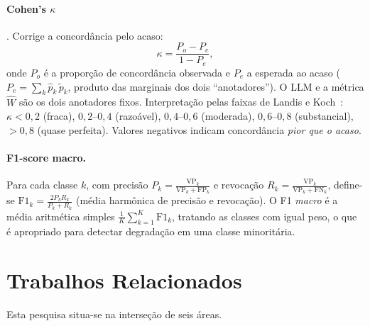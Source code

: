 \documentclass[12pt,a4paper]{article}
\newcommand{\West}{\ensuremath{\hat{W}}}   %
\begin{document}
\paragraph{Cohen's $\kappa$} \cite{artsteinInterCoder2008}. Corrige a concordância pelo
acaso:
\begin{equation}
  \kappa = \frac{P_o - P_e}{1 - P_e},
\end{equation}
onde $P_o$ é a proporção de concordância observada e $P_e$ a esperada ao acaso
($P_e = \sum_k \hat{p}_k\,\tilde{p}_k$, produto das marginais dos dois ``anotadores''). O
LLM e a métrica \West{} são os dois anotadores fixos. Interpretação pelas faixas de Landis e
Koch~\cite{landisKoch1977}: $\kappa<0{,}2$ (fraca),
$0{,}2$–$0{,}4$ (razoável), $0{,}4$–$0{,}6$ (moderada), $0{,}6$–$0{,}8$ (substancial),
$>0{,}8$ (quase perfeita). Valores negativos indicam concordância \emph{pior que o acaso}.

\paragraph{F1-score macro.} Para cada classe $k$, com precisão
$P_k = \frac{\text{VP}_k}{\text{VP}_k + \text{FP}_k}$ e revocação
$R_k = \frac{\text{VP}_k}{\text{VP}_k + \text{FN}_k}$, define-se
$\text{F1}_k = \frac{2 P_k R_k}{P_k + R_k}$ (média harmônica de precisão e revocação). O
F1 \emph{macro} é a média aritmética simples $\frac{1}{K}\sum_{k=1}^K \text{F1}_k$, tratando
as classes com igual peso, o que é apropriado para detectar degradação em uma classe
minoritária.

\section{Trabalhos Relacionados}
\label{sec:relacionados}

Esta pesquisa situa-se na interseção de seis áreas.
\end{document}
